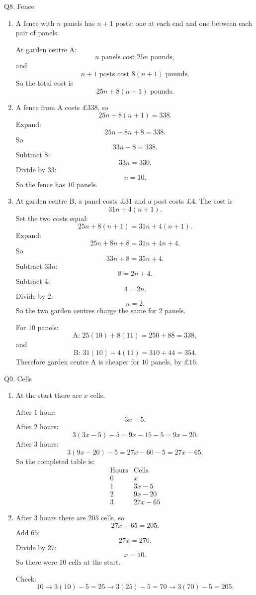 \documentclass[11pt,a4paper]{article}
\begin{document}
\begin{solbox}{Q8. Fence}
\begin{enumerate}[label=(\alph*)]
\item A fence with \(n\) panels has \(n+1\) posts: one at each end and one between each pair of panels.

At garden centre A:
\[
n\text{ panels cost }25n\text{ pounds},
\]
and
\[
n+1\text{ posts cost }8(n+1)\text{ pounds}.
\]
So the total cost is
\[
\boxed{25n+8(n+1)\text{ pounds}}.
\]

\item A fence from A costs \(\pounds338\), so
\[
25n+8(n+1)=338.
\]
Expand:
\[
25n+8n+8=338.
\]
So
\[
33n+8=338.
\]
Subtract \(8\):
\[
33n=330.
\]
Divide by \(33\):
\[
n=10.
\]
So the fence has \(\boxed{10\text{ panels}}\).

\item At garden centre B, a panel costs \(\pounds31\) and a post costs \(\pounds4\). The cost is
\[
31n+4(n+1).
\]
Set the two costs equal:
\[
25n+8(n+1)=31n+4(n+1).
\]
Expand:
\[
25n+8n+8=31n+4n+4.
\]
So
\[
33n+8=35n+4.
\]
Subtract \(33n\):
\[
8=2n+4.
\]
Subtract \(4\):
\[
4=2n.
\]
Divide by \(2\):
\[
n=2.
\]
So the two garden centres charge the same for \(\boxed{2\text{ panels}}\).

For \(10\) panels:
\[
\text{A: }25(10)+8(11)=250+88=338,
\]
and
\[
\text{B: }31(10)+4(11)=310+44=354.
\]
Therefore garden centre A is cheaper for \(10\) panels, by \(\pounds16\).
\end{enumerate}
\end{solbox}

\begin{solbox}{Q9. Cells}
\begin{enumerate}[label=(\alph*)]
\item At the start there are \(x\) cells.

After \(1\) hour:
\[
3x-5.
\]
After \(2\) hours:
\[
3(3x-5)-5=9x-15-5=9x-20.
\]
After \(3\) hours:
\[
3(9x-20)-5=27x-60-5=27x-65.
\]
So the completed table is:
\[
\begin{array}{c|c}
\text{Hours} & \text{Cells}\\ \hline
0 & x\\
1 & 3x-5\\
2 & 9x-20\\
3 & 27x-65
\end{array}
\]

\item After \(3\) hours there are \(205\) cells, so
\[
27x-65=205.
\]
Add \(65\):
\[
27x=270.
\]
Divide by \(27\):
\[
x=10.
\]
So there were \(\boxed{10\text{ cells}}\) at the start.

Check:
\[
10\to 3(10)-5=25\to 3(25)-5=70\to 3(70)-5=205.
\]
\end{enumerate}
\end{solbox}
\end{document}
